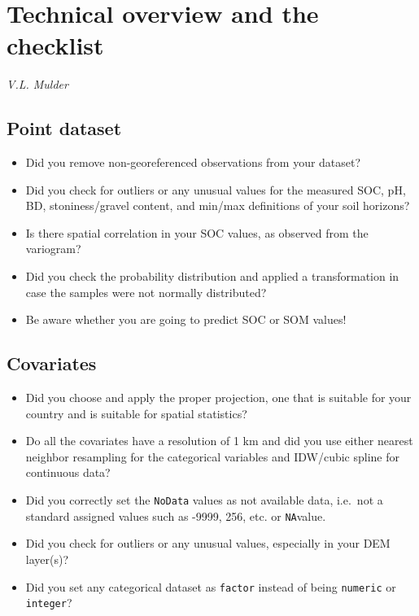 \documentclass[10pt,b5paper,]{book}
\providecommand{\tightlist}{%
  \setlength{\itemsep}{0pt}\setlength{\parskip}{0pt}}
\theoremstyle{definition}
\theoremstyle{definition}
\theoremstyle{definition}
\theoremstyle{remark}
\begin{document}
\hypertarget{technical-overview-and-the-checklist}{%
\chapter{Technical overview and the
checklist}\label{technical-overview-and-the-checklist}}

\emph{V.L. Mulder}

\hypertarget{point-dataset}{%
\section{Point dataset}\label{point-dataset}}

\begin{itemize}
\tightlist
\item
  Did you remove non-georeferenced observations from your dataset?
\item
  Did you check for outliers or any unusual values for the measured SOC,
  pH, BD, stoniness/gravel content, and min/max definitions of your soil
  horizons?
\item
  Is there spatial correlation in your SOC values, as observed from the
  variogram?
\item
  Did you check the probability distribution and applied a
  transformation in case the samples were not normally distributed?
\item
  Be aware whether you are going to predict SOC or SOM values!
\end{itemize}

\hypertarget{covariates-1}{%
\section{Covariates}\label{covariates-1}}

\begin{itemize}
\tightlist
\item
  Did you choose and apply the proper projection, one that is suitable
  for your country and is suitable for spatial statistics?
\item
  Do all the covariates have a resolution of 1 km and did you use either
  nearest neighbor resampling for the categorical variables and
  IDW/cubic spline for continuous data?
\item
  Did you correctly set the \texttt{NoData} values as not available
  data, i.e.~not a standard assigned values such as -9999, 256, etc. or
  \texttt{NA}value.
\item
  Did you check for outliers or any unusual values, especially in your
  DEM layer(s)?
\item
  Did you set any categorical dataset as \texttt{factor} instead of
  being \texttt{numeric} or \texttt{integer}?
\end{itemize}
\end{document}
